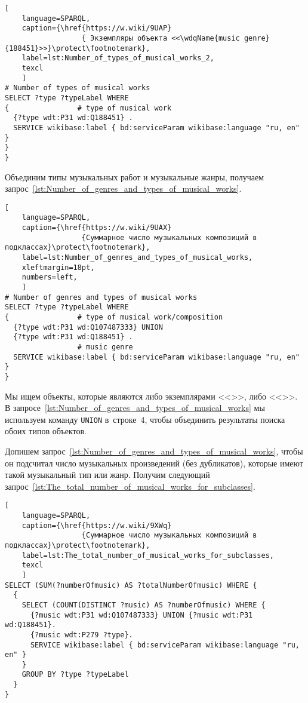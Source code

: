 \begin{lstlisting}[ 
    language=SPARQL,
    caption={\href{https://w.wiki/9UAP}
                  { Экземпляры объекта <<\wdqName{music genre}{188451}>>}\protect\footnotemark},
    label=lst:Number_of_types_of_musical_works_2,
    texcl
    ]
# Number of types of musical works
SELECT ?type ?typeLabel WHERE 
{                # type of musical work
  {?type wdt:P31 wd:Q188451} .
  SERVICE wikibase:label { bd:serviceParam wikibase:language "ru, en" }
}
}
\end{lstlisting}%

Объединим типы музыкальных работ и музыкальные жанры, получаем запрос~\ref{lst:Number_of_genres_and_types_of_musical_works}.

\begin{lstlisting}[ 
    language=SPARQL,
    caption={\href{https://w.wiki/9UAX}
                  {Суммарное число музыкальных композиций в подклассах}\protect\footnotemark},
    label=lst:Number_of_genres_and_types_of_musical_works,
    xleftmargin=18pt,
    numbers=left,
    ]
# Number of genres and types of musical works
SELECT ?type ?typeLabel WHERE 
{                # type of musical work/composition
  {?type wdt:P31 wd:Q107487333} UNION 
  {?type wdt:P31 wd:Q188451} .
                 # music genre
  SERVICE wikibase:label { bd:serviceParam wikibase:language "ru, en" }
}
\end{lstlisting}%

Мы ищем объекты, которые являются либо экземплярами <<>>, либо <<>>. В запросе~\ref{lst:Number_of_genres_and_types_of_musical_works} мы используем команду \lstinline|UNION| в~строке~4, чтобы объединить результаты поиска обоих типов объектов.

Допишем запрос~\ref{lst:Number_of_genres_and_types_of_musical_works}, чтобы он подсчитал число музыкальных произведений (без дубликатов), которые имеют такой музыкальный тип или жанр. Получим следующий запрос~\ref{lst:The_total_number_of_musical_works_for_subclasses}.
\begin{lstlisting}[ 
    language=SPARQL,
    caption={\href{https://w.wiki/9XWq}
                  {Суммарное число музыкальных композиций в подклассах}\protect\footnotemark},
    label=lst:The_total_number_of_musical_works_for_subclasses,
    texcl
    ]
SELECT (SUM(?numberOfmusic) AS ?totalNumberOfmusic) WHERE {
  {
    SELECT (COUNT(DISTINCT ?music) AS ?numberOfmusic) WHERE {
      {?music wdt:P31 wd:Q107487333} UNION {?music wdt:P31 wd:Q188451}.
      {?music wdt:P279 ?type}.
      SERVICE wikibase:label { bd:serviceParam wikibase:language "ru, en" }
    }
    GROUP BY ?type ?typeLabel
  }
}
\end{lstlisting}%

